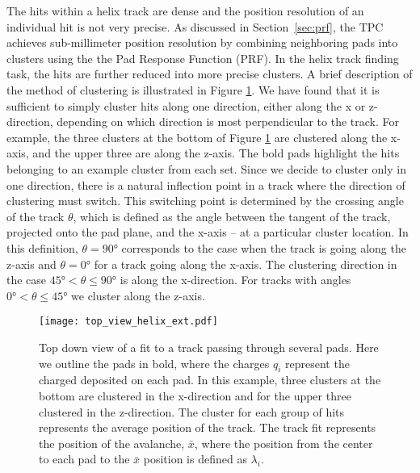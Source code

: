 The hits within a helix track are dense and the position resolution of an individual hit is not very precise. As discussed in Section~\ref{sec:prf}, the TPC achieves sub-millimeter position resolution by combining neighboring pads into clusters using the the Pad Response Function (PRF). In the helix track finding task, the hits are further reduced into more precise clusters. A brief description of the method of clustering is illustrated in Figure \ref{fig:topview}. We have found that it is sufficient to simply cluster hits along one direction, either along the x or z-direction, depending on which direction is most perpendicular to the track. For example, the three clusters at the bottom of Figure \ref{fig:topview} are clustered along the x-axis, and the upper three are along the z-axis. The bold pads highlight the hits belonging to an example cluster from each set. Since we decide to cluster only in one direction, there is a natural inflection point in a track where the direction of clustering must switch. This switching point is determined by the crossing angle of the track $\theta$, which is defined as the angle between the tangent of the track, projected onto the pad plane, and the x-axis -- at a particular cluster location. In this definition, $\theta = \ang{90}$ corresponds to the case when the track is going along the z-axis and $\theta = \ang{0}$ for a track going along the x-axis.  The clustering direction in the case $\ang{45} < \theta \leq \ang{90} $ is along the x-direction. For tracks with angles $\ang{0} < \theta \leq \ang{45}$ we cluster along the z-axis. 

 

\begin{figure}[!htb]
\centering
\texttt{[image: top\_view\_helix\_ext.pdf]}
\caption{Top down view of a fit to a track passing through several pads. Here we outline the pads in bold, where the charges $q_i$ represent the charged deposited on each pad. In this example, three clusters at the bottom are clustered in the x-direction and for the upper three clustered in the z-direction. The cluster for each group of hits represents the average position of the track. The track fit represents the position of the avalanche, $\bar{x}$,  where the position from the center to each pad to the $\bar{x}$ position is defined as $\lambda_i$.}
\label{fig:topview}
\end{figure}

